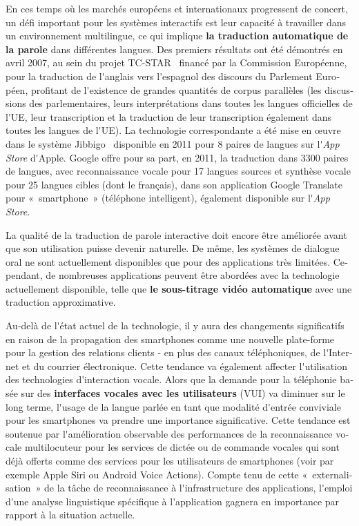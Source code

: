 \begin{french}
\begin{multicols}{2}
En ces temps où les marchés européens et internationaux progressent de
concert, un défi important pour les systèmes interactifs est leur
capacité à travailler dans un environnement multilingue, ce qui
implique {\bf la traduction automatique de la parole} dans différentes
langues. Des premiers résultats ont été démontrés en avril 2007, au
sein du projet TC-STAR~\cite{tcstarurl} financé par la Commission
Européenne, pour la traduction de l{\mbox '}anglais vers l{\mbox
  '}espagnol des discours du Parlement Européen, profitant de l{\mbox
  '}existence de grandes quantités de corpus parallèles (les
discussions des parlementaires, leurs interprétations dans toutes les
langues officielles de l{\mbox '}UE, leur transcription et la
traduction de leur transcription également dans toutes les langues de
l{\mbox '}UE). La technologie correspondante a été mise en œuvre dans
le système Jibbigo~\cite{jibbigo} disponible en 2011 pour 8 paires de langues
sur l{\mbox '}{\em {\mbox App Store}} d{\mbox '}Apple. Google offre
pour sa part, en 2011, la traduction dans 3300 paires de langues, avec
reconnaissance vocale pour 17 langues sources et synthèse vocale pour
25 langues cibles (dont le français), dans son application Google
Translate pour «~smartphone~» (téléphone intelligent), également
disponible sur l{\mbox '}{\em {\mbox App Store}}.

La qualité de la traduction de parole interactive doit encore être
améliorée avant que son utilisation puisse devenir naturelle. De même,
les systèmes de dialogue oral ne sont actuellement disponibles que
pour des applications très limitées. Cependant, de nombreuses
applications peuvent être abordées avec la technologie actuellement
disponible, telle que {\bf le sous-titrage vidéo automatique} avec une
traduction approximative.

Au-delà de l{\mbox '}état actuel de la technologie, il y aura des
changements significatifs en raison de la propagation des smartphones
comme une nouvelle plate-forme pour la gestion des relations clients -
en plus des canaux téléphoniques, de l{\mbox '}Internet et du courrier
électronique. Cette tendance va également affecter l{\mbox
  '}utilisation des technologies d{\mbox '}interaction vocale. Alors
que la demande pour la téléphonie basée sur des {\bf interfaces
  vocales avec les utilisateurs} (VUI) va diminuer sur le long terme,
l{\mbox '}usage de la langue parlée en tant que modalité d{\mbox
  '}entrée conviviale pour les smartphones va prendre une importance
significative. Cette tendance est soutenue par l{\mbox '}amélioration
observable des performances de la reconnaissance vocale multilocuteur
pour les services de dictée ou de commande vocales qui sont déjà
offerts comme des services pour les utilisateurs de smartphones (voir
par exemple Apple Siri ou Android Voice Actions). Compte tenu de cette
«~externalisation~» de la tâche de reconnaissance à l{\mbox
  '}infrastructure des applications, l{\mbox '}emploi d{\mbox '}une
analyse linguistique spécifique à l{\mbox '}application gagnera en
importance par rapport à la situation actuelle.


\end{multicols}
\end{french}
